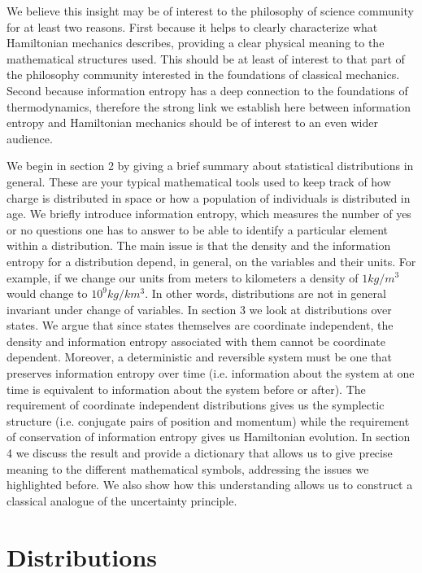 \documentclass[11pt]{article}
\begin{document}
We believe this insight may be of interest to the philosophy of science community for at least two reasons. First because it helps to clearly characterize what Hamiltonian mechanics describes, providing a clear physical meaning to the mathematical structures used. This should be at least of interest to that part of the philosophy community interested in the foundations of classical mechanics. Second because information entropy has a deep connection to the foundations of thermodynamics, therefore the strong link we establish here between information entropy and Hamiltonian mechanics should be of interest to an even wider audience.

We begin in section 2 by giving a brief summary about statistical distributions in general. These are your typical mathematical tools used to keep track of how charge is distributed in space or how a population of individuals is distributed in age. We briefly introduce information entropy, which measures the number of yes or no questions one has to answer to be able to identify a particular element within a distribution. The main issue is that the density and the information entropy for a distribution depend, in general, on the variables and their units. For example, if we change our units from meters to kilometers a density of $1 kg/m^3$ would change to $10^9 kg/km^3$. In other words, distributions are not in general invariant under change of variables. In section 3 we look at distributions over states. We argue that since states themselves are coordinate independent, the density and information entropy associated with them cannot be coordinate dependent. Moreover, a deterministic and reversible system must be one that preserves information entropy over time (i.e. information about the system at one time is equivalent to information about the system before or after). The requirement of coordinate independent distributions gives us the symplectic structure (i.e. conjugate pairs of position and momentum) while the requirement of conservation of information entropy gives us Hamiltonian evolution. In section 4 we discuss the result and provide a dictionary that allows us to give precise meaning to the different mathematical symbols, addressing the issues we highlighted before. We also show how this understanding allows us to construct a classical analogue of the uncertainty principle.

\section{Distributions}
\end{document}
